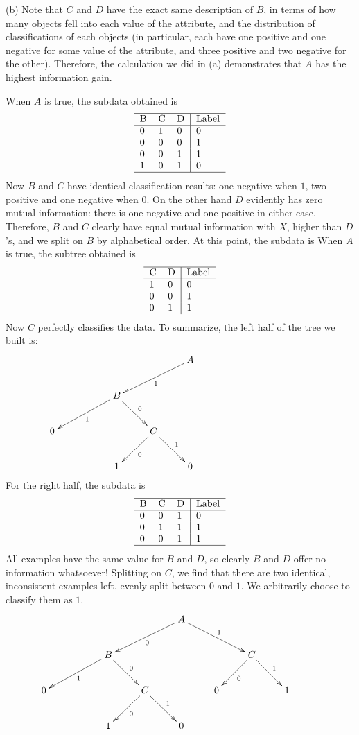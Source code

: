 \documentclass[12pt]{amsart}
\theoremstyle{remark}
\begin{document}
(b)  Note that $C$ and $D$ have the exact same description of $B$, in terms of how many objects fell into each value of the attribute, and the distribution of classifications of each objects (in particular, each have one positive and one negative for some value of the attribute, and three positive and two negative for the other). Therefore, the calculation we did in (a) demonstrates that $A$ has the highest information gain. 

When $A$ is true, the subdata obtained is 
\[
\begin{tabular}{lll|l}
\hline
B & C & D & Label \\
\hline
0 & 1 & 0 & 0 \\
0 & 0 & 0 & 1 \\
0 & 0 & 1 & 1 \\
1 & 0 & 1 & 0 \\
\hline
\end{tabular}
\]
Now $B$ and $C$ have identical classification results: one negative when $1$, two positive and one negative when $0$. On the other hand $D$ evidently has zero mutual information: there is one negative and one positive in either case. Therefore, $B$ and $C$ clearly have equal mutual information with $X$, higher than $D$'s, and we split on $B$ by alphabetical order. At this point, the subdata is 
When $A$ is true, the subtree obtained is 
\[
\begin{tabular}{ll|l}
\hline
 C & D & Label \\
\hline
1 & 0 & 0 \\
 0 & 0 & 1 \\
 0 & 1 & 1 \\
\end{tabular}
\]
Now $C$ perfectly classifies the data. To summarize, the left half of the tree we built is:
\[
\xymatrix{
 & &  &  & A \ar[dll]^1& & & &  \\
& &  \ar[dll]^1 B \ar[dr]^0  & & & & &\\
0&  & &  C \ar[dl]^0 \ar[dr]^1 &   & & & & \\
 & & 1 & & 0 &  & & & 
}
\]
For the right half, the subdata is 
\[
\begin{tabular}{lll|l}
\hline
B & C & D & Label \\
\hline
0 & 0 & 1 & 0 \\
0 & 1 & 1 & 1 \\
0 & 0 & 1 & 1 \\
\hline
\end{tabular}
\]
All examples have the same value for $B$ and $D$, so clearly $B$ and $D$ offer no information whatsoever! Splitting on $C$, we find that there are two identical, inconsistent examples left, evenly split between $0$ and $1$. We arbitrarily choose to classify them as $1$. 
\[
\xymatrix{
 & &  &  & A \ar[dll]^0 \ar[drr]^1& & & &  \\
& &  \ar[dll]^1 B \ar[dr]^0  & & & & C \ar[dl]^0 \ar[dr]^1&\\
0&  & &  C \ar[dl]^0 \ar[dr]^1 &   & 0& & 1&\\
 & & 1 & & 0 &  & & & 
}
\]
\end{document}
